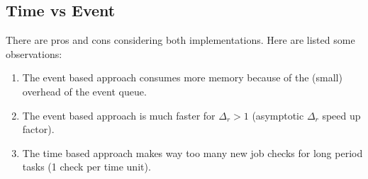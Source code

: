 \subsection{Time vs Event}

There are pros and cons considering both implementations. Here are listed some observations:

\begin{enumerate}
	\item The event based approach consumes more memory because of the (small) overhead of the event queue.
	\item The event based approach is much faster for $\Delta_r > 1$ (asymptotic $\Delta_r$ speed up factor).
	\item The time based approach makes way too many new job checks for long period tasks (1 check per time unit).
\end{enumerate}
